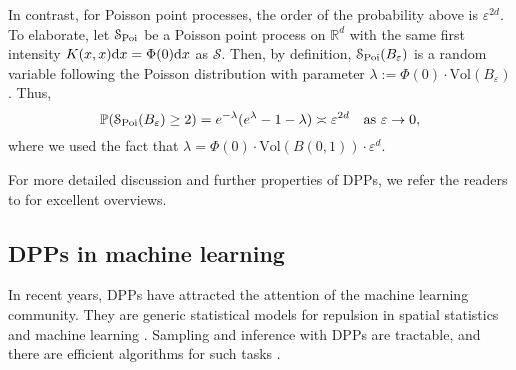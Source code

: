 In contrast, for Poisson point processes, the order of the probability above is $\varepsilon^{2d}$. To elaborate, let $\mathcal S_{\mathrm{Poi}}$ be a Poisson point process on $\mathbb R^d$ with the same first intensity $K(x,x)\mathrm{d} x = \Phi(0) \mathrm{d} x$ as $\mathcal S$. Then, by definition, $\mathcal S_{\mathrm{Poi}}(B_\varepsilon)$ is a random variable following the Poisson distribution with parameter $\lambda :=\Phi(0) \cdot\mathrm{Vol}(B_\varepsilon)$. Thus,
\begin{equation} \label{eq:Poisson_repel}
    \mathbb P(\mathcal S_{\mathrm{Poi}}(B_\varepsilon) \ge 2) = e^{-\lambda}(e^\lambda - 1 - \lambda) \asymp \varepsilon^{2d} \quad \text{as } \varepsilon\rightarrow 0,
\end{equation}
where we used the fact that $\lambda = \Phi(0) \cdot \mathrm{Vol}(B(0,1)) \cdot \varepsilon^d$.

\medskip  

For more detailed discussion and further properties of DPPs, we refer the readers to \cite{SoshDPP,HKPV,LyonsIHES,lyons2014survey} for excellent overviews. 
\begin{comment}
    This definition implies that, for each bounded measurable real-valued function $\phi$, $\mathbb{E}[\sum \limits_{x \in \mathcal{S}} \phi(x) ] = \int_{\mathcal{X}} \phi(x) K(x,x) \mu(dx)$.
The variance can be computed in a similar way.
It is also worth mentioning that each kernel $K$ do not carry a DPP and the precise conditions for this to be the case are given by the Macchi-Soshnikov theorem. This definition is rather general, but, in machine learning, often discrete DPPs are considered instead. The general framework for discrete DPPs in machine learning was developed in \cite{KuleszaTaskar}.
\end{comment}

\subsection{DPPs in machine learning}
In recent years, DPPs have attracted the attention of the machine learning community. They are generic statistical models for repulsion in
spatial statistics \cite{LaMoRu14, biscio2017contrast} and machine learning \cite{kulesza_determinantal_2012, belhadji_determinantal_2020, gartrell2019learning, gartrell2020scalable, determinantal-averaging, tremblay2019determinantal, GDP}. Sampling and inference with DPPs are tractable, and there are efficient algorithms for such tasks \cite{kulesza_determinantal_2012, GDP, gartrell_scalablesampling, han2022scalable}.

